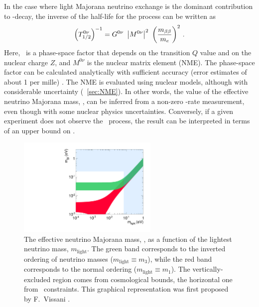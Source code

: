 \documentclass{PoS}
\begin{document}
In the case where light Majorana neutrino exchange is the dominant contribution to \bbonu-decay, the inverse of the half-life for the process can be written as \cite{Doi:1985dx}
\begin{equation}
\left(T^{0\nu}_{1/2}\right)^{-1} = G^{0\nu}\ \left|M^{0\nu}\right|^2\ \left(\frac{\mbb}{m_{e}}\right)^2\, .
\label{eq:Tonu}
\end{equation}
Here, \Gonu\ is a phase-space factor that depends on the transition $Q$ value and on the nuclear charge $Z$, and $M^{0\nu}$ is the nuclear matrix element (NME). The phase-space factor can be calculated analytically with sufficient accuracy (error estimates of about 1 per mille) \cite{Kotila:2012zza}. The NME is evaluated using nuclear models, although with considerable uncertainty (\textsection~\ref{sec:NME}). In other words, the value of the effective neutrino Majorana mass, \mbb, can be inferred from a non-zero \bbonu-rate measurement, even though with some nuclear physics uncertainties. Conversely, if a given experiment does not observe the \bbonu\ process, the result can be interpreted in terms of an upper bound on \mbb.  

\begin{figure}
\centering
\includegraphics[width=0.6\textwidth]{img/BetaBetaVsLight.pdf}
\caption{The effective neutrino Majorana mass, \mbb, as a function of the lightest neutrino mass, $m_\mathrm{light}$. The green band corresponds to the inverted ordering of neutrino masses ($m_\mathrm{light}\equiv m_{3}$), while the red band corresponds to the normal ordering ($m_\mathrm{light}\equiv m_{1}$). The vertically-excluded region comes from cosmological bounds, the horizontal one from \bbonu\ constraints. This graphical representation was first proposed by F.~Vissani \cite{Vissani:1999tu}.} \label{fig:BetaBetaVsLight}
\end{figure}
\end{document}
